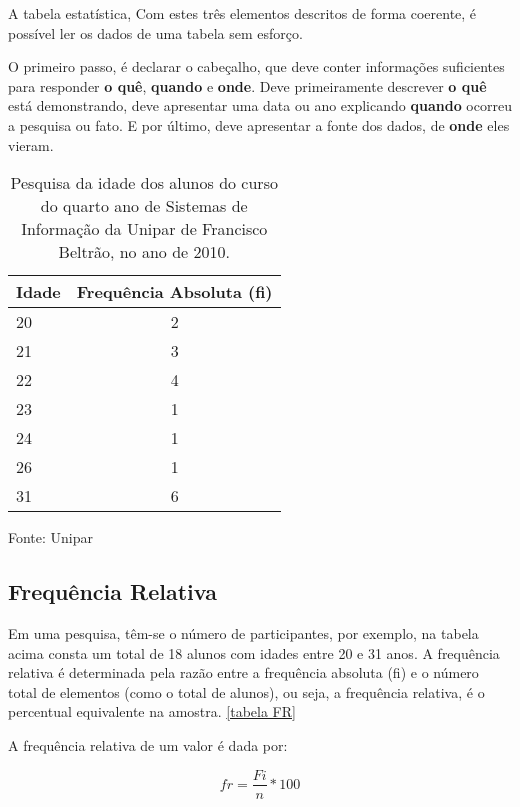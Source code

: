 \documentclass[espaco=simples,appendix=Name]{abnt}
\newcommand{\code}[1] {\textbf{#1}}
\begin{document}
A tabela estatística, Com estes três elementos descritos de forma coerente, é possível ler os dados de uma tabela sem esforço. 

O primeiro passo, é declarar o cabeçalho, que deve conter informações suficientes para responder \code{o quê}, \textbf{quando} e \textbf{onde}. Deve primeiramente descrever \textbf{o quê} está demonstrando, deve apresentar uma data ou ano explicando \textbf{quando} ocorreu a pesquisa ou fato. E por último, deve apresentar a fonte dos dados, de \textbf{onde} eles vieram.

\begin{table}
\caption{Pesquisa da idade dos alunos do curso do quarto ano de Sistemas de Informação da Unipar de Francisco Beltrão, no ano de 2010.}
\begin{tabular}{|l|c|} 
\hline 
Idade & Frequência Absoluta (\code{fi}) \\ \hline 
20 & 2 \\
21 & 3 \\
22 & 4 \\
23 & 1 \\
24 & 1 \\
26 & 1 \\
31 & 6 \\ 
\hline 
\end{tabular}
\small{Fonte: Unipar}
\end{table}

\subsection { Frequência Relativa }


Em uma pesquisa, têm-se o número de participantes, por exemplo, na tabela acima consta um total de 18 alunos com idades entre 20 e 31 anos. A frequência relativa é determinada pela razão entre a frequência absoluta (fi) e o número total de elementos (como o total de alunos), ou seja, a frequência relativa, é o percentual equivalente na amostra. \ref{tabela FR}

A frequência relativa de um valor é dada por:

\begin{equation}
\label{fr}
fr = \frac{Fi}{n} * 100
\end{equation} 
\end{document}
